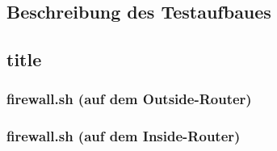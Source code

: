 \subsection{Beschreibung des Testaufbaues}
\label{app:Test}
\subsection{title}
\subsubsection{firewall.sh (auf dem Outside-Router)}
\label{app:Firewall-Outside}


\subsubsection{firewall.sh (auf dem Inside-Router)}
\label{app:Firewall-Inside}

